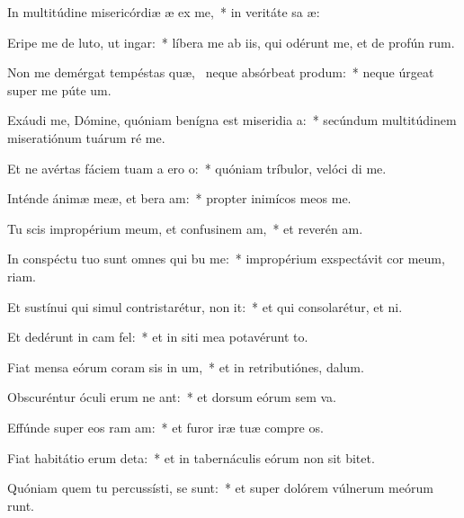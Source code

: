 \item In multitúdine misericórdiæ æ ex me,~* in veritáte sa æ:
\item Eripe me de luto, ut  ingar:~* líbera me ab iis, qui odérunt me, et de profún rum.
\item Non me demérgat tempéstas quæ,~\pscross{} neque absórbeat  produm:~* neque úrgeat super me púte  um.
\item Exáudi me, Dómine, quóniam benígna est miseridia a:~* secúndum multitúdinem miseratiónum tuárum ré  me.
\item Et ne avértas fáciem tuam a ero o:~* quóniam tríbulor, velóci di me.
\item Inténde ánimæ meæ, et bera am:~* propter inimícos meos  me.
\item Tu scis impropérium meum, et confusinem am,~* et reverén am.
\item In conspéctu tuo sunt omnes qui bu me:~* impropérium exspectávit cor meum,  riam.
\item Et sustínui qui simul contristarétur,  non it:~* et qui consolarétur, et  ni.
\item Et dedérunt in cam  fel:~* et in siti mea potavérunt  to.
\item Fiat mensa eórum coram sis in um,~* et in retributiónes,   dalum.
\item Obscuréntur óculi erum ne ant:~* et dorsum eórum sem va.
\item Effúnde super eos ram am:~* et furor iræ tuæ compre os.
\item Fiat habitátio erum deta:~* et in tabernáculis eórum non sit  bitet.
\item Quóniam quem tu percussísti, se sunt:~* et super dolórem vúlnerum meórum runt.
